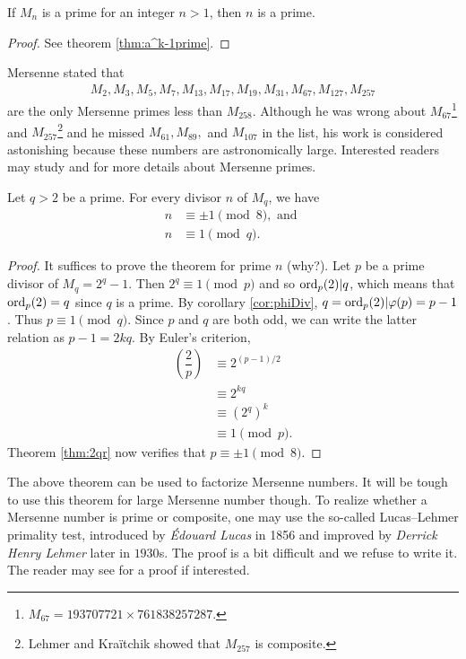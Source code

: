 \documentclass{subfiles}
\begin{document}
	\begin{proposition}
		If $M_n$ is a prime for an integer $n>1$, then $n$ is a prime.
	\end{proposition}
	
	\begin{proof}
		See theorem \eqref{thm:a^k-1prime}.
	\end{proof}
	
	Mersenne stated that 
	\begin{align*}
		M_{2}, M_{3}, M_{5}, M_{7}, M_{13},M_{17},M_{19},M_{31},M_{67},M_{127},M_{257}
	\end{align*}
	are the only Mersenne primes less than $M_{258}$. Although he was wrong about $M_{67}$\footnote{$M_{67}=193707721 \times 761838257287.$} and $M_{257}$\footnote{Lehmer and Kra\"{i}tchik showed that $M_{257}$ is composite.} and he missed $M_{61}, M_{89},$ and $M_{107}$ in the list, his work is considered astonishing because these numbers are astronomically large. Interested readers may study \cite{ch:primes-archibald} and \cite{ch:primes-ribenboim} for more details about Mersenne primes.
	
	\begin{theorem}
		Let $q>2$ be a prime. For every divisor $n$ of $M_q$, we have
		\begin{align*}
			n &\equiv \pm 1 \pmod 8, \text{ and }\\
			n &\equiv 1 \pmod q.
		\end{align*}
	\end{theorem}
	
	\begin{proof}
		It suffices to prove the theorem for prime $n$ (why?). Let $p$ be a prime divisor of $M_q=2^q-1$. Then $2^q \equiv 1 \pmod p$ and so $\operatorname{ord}_p(2)|q$, which means that $\operatorname{ord}_p(2)=q$ since $q$ is a prime. By corollary \eqref{cor:phiDiv}, $q=\operatorname{ord}_p(2)|\varphi(p)=p-1$. Thus $p \equiv 1 \pmod q$. Since $p$ and $q$ are both odd, we can write the latter relation as $p-1=2kq$. By Euler's criterion,
		\begin{align*}
			\left(\dfrac{2}{p}\right) &\equiv 2^{(p-1)/2} \\
			&\equiv 2^{kq}\\
			&\equiv \left(2^q\right)^k\\
			&\equiv 1 \pmod p.
		\end{align*}
		Theorem \eqref{thm:2qr} now verifies that $p \equiv \pm 1 \pmod 8$.
	\end{proof}
	
	The above theorem can be used to factorize Mersenne numbers. It will be tough to use this theorem for large Mersenne number though. To realize whether a Mersenne number is prime or composite, one may use the so-called Lucas–Lehmer primality test, introduced by \textit{\'Edouard Lucas} in 1856 and improved by \textit{Derrick Henry Lehmer} later in $1930$s. The proof is a bit difficult and we refuse to write it. The reader may see \cite{ch:primes-bruce} for a proof if interested.
	
\end{document}
